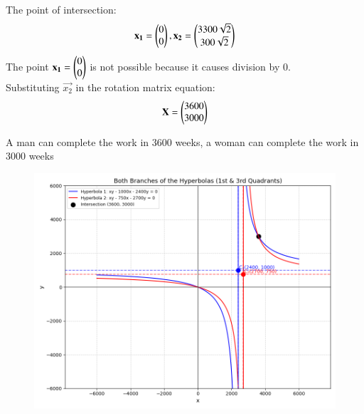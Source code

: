 \documentclass[journal]{IEEEtran}
\begin{document}
The point of intersection:
\begin{align}
\mathbf{x_1} = \begin{pmatrix}0 \\ 0\end{pmatrix}, \mathbf{x_2} = \begin{pmatrix}3300\sqrt{2} \\ 300\sqrt{2}\end{pmatrix}
\end{align}
The point $\mathbf{x_1} = \begin{pmatrix}0 \\ 0\end{pmatrix}$ is not possible because it causes division by 0.\\

Substituting $\vec{x_2}$ in the rotation matrix equation:
\begin{align}
\mathbf{X} = \begin{pmatrix}3600 \\ 3000\end{pmatrix}
\end{align}

A man can complete the work in 3600 weeks, a woman can complete the work in 3000 weeks
    \begin{figure}[H]
        \centering
        \includegraphics[height=0.5\textheight, keepaspectratio]{figs/Figure_1.png}
        \label{figure_1}
    \end{figure}
\end{document}
